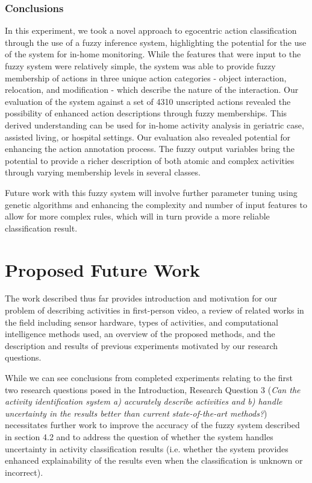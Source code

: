 \documentclass[12pt]{report}
\begin{document}
\subsection{Conclusions}
In this experiment, we took a novel approach to egocentric action classification through the use of a fuzzy inference system, highlighting the potential for the use of the system for in-home monitoring. While the features that were input to the fuzzy system were relatively simple, the system was able to provide fuzzy membership of actions in three unique action categories - object interaction, relocation, and modification - which describe the nature of the interaction. Our evaluation of the system against a set of 4310 unscripted actions revealed the possibility of enhanced action descriptions through fuzzy memberships. This derived understanding can be used for in-home activity analysis in geriatric case, assisted living, or hospital settings. Our evaluation also revealed potential for enhancing the action annotation process. The fuzzy output variables bring the potential to provide a richer description of both atomic and complex activities through varying membership levels in several classes.

Future work with this fuzzy system will involve further parameter tuning using genetic algorithms and enhancing the complexity and number of input features to allow for more complex rules, which will in turn provide a more reliable classification result.




\chapter{Proposed Future Work}
The work described thus far provides introduction and motivation for our problem of describing activities in first-person video, a review of related works in the field including sensor hardware, types of activities, and computational intelligence methods used, an overview of the proposed methods, and the description and results of previous experiments motivated by our research questions. 

While we can see conclusions from completed experiments relating to the first two research questions posed in the Introduction, Research Question 3 (\emph{Can the activity identification system a) accurately describe activities and b) handle uncertainty in the results better than current state-of-the-art methods?}) necessitates further work to improve the accuracy of the fuzzy system described in section 4.2 and to address the question of whether the system handles uncertainty in activity classification results (i.e. whether the system provides enhanced explainability of the results even when the classification is unknown or incorrect).
\end{document}
